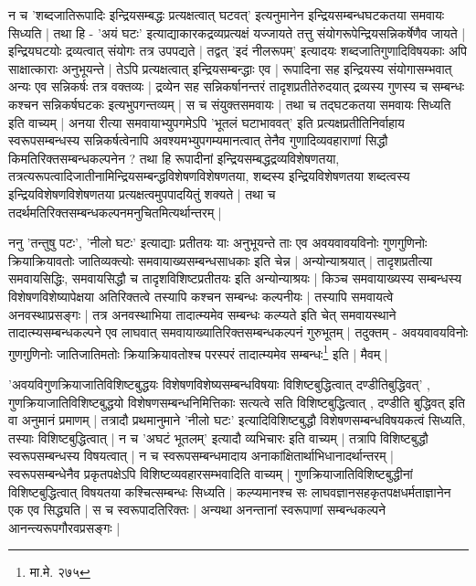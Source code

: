 न च 'शब्दजातिरूपादिः इन्द्रियसम्बद्धः प्रत्यक्षत्वात् घटवत्'  इत्यनुमानेन इन्द्रियसम्बन्धघटकतया समवायः सिध्यति | तथा हि - 'अयं घटः' इत्याद्याकारकद्रव्यप्रत्यक्षं यज्जायते तत्तु संयोगरूपेन्द्रियसन्निकर्षेणैव जायते | इन्द्रियघटयोः द्रव्यत्वात् संयोगः तत्र उपपद्यते | तद्वत् 'इदं नीलरूपम्' इत्यादयः शब्दजातिगुणादिविषयकाः अपि साक्षात्काराः अनुभूयन्ते | तेऽपि प्रत्यक्षत्वात् इन्द्रियसम्बन्द्धाः एव | रूपादिना सह इन्द्रियस्य संयोगासम्भवात् अन्यः एव सन्निकर्षः तत्र वक्तव्यः | द्रव्येन सह सन्निकर्षानन्तरं तादृशप्रतीतेरुदयात् द्रव्यस्य गुणस्य च सम्बन्धः कश्चन सन्निकर्षघटकः इत्यभुपगन्तव्यम् | स च संयुक्तसमवायः | तथा च तद्घटकतया समवायः सिध्यति इति वाच्यम् | अनया रीत्या समवायाभ्युपगमेऽपि 'भूतलं घटाभाववत्' इति प्रत्यक्षप्रतीतिनिर्वाहाय स्वरूपसम्बन्धस्य सन्निकर्षत्वेनापि अवश्यमभ्युपगम्यमानत्वात् तेनैव गुणादिव्यवहाराणां सिद्धौ किमतिरिक्तसम्बन्धकल्पनेन ? तथा हि रूपादीनां इन्द्रियसम्बद्धद्रव्यविशेषणतया, तत्रत्यरूपत्वादिजातीनामिन्द्रियसम्बन्द्धविशेषणविशेषणतया, शब्दस्य इन्द्रियविशेषणतया शब्दत्वस्य इन्द्रियविशेषणविशेषणतया प्रत्यक्षत्वमुपपादयितुं शक्यते | तथा च तदर्थमतिरिक्तसम्बन्धकल्पनमनुचितमित्यर्थान्तरम् |

ननु 'तन्तुषु पटः', 'नीलो घटः' इत्याद्याः प्रतीतयः याः अनुभूयन्ते ताः एव अवयवावयविनोः‌ गुणगुणिनोः क्रियाक्रियावतोः जातिव्यक्त्योः समवायाख्यसम्बन्धसाधकाः इति चेन्न | अन्योन्याश्रयात् | तादृशप्रतीत्या समवायसिद्धिः, समवायसिद्धौ च तादृशविशिष्टप्रतीतयः इति अन्योन्याश्रयः | किञ्च समवायाख्यस्य सम्बन्धस्य विशेषणविशेष्यापेक्षया अतिरिक्तत्वे तस्यापि कश्चन सम्बन्धः कल्पनीयः | तस्यापि समवायत्वे अनवस्थाप्रसङ्गः | तत्र अनवस्थाभिया तादात्म्यमेव सम्बन्धः कल्प्यते इति चेत् समवायस्थाने तादात्म्यसम्बन्धकल्पने एव लाघवात् समवायाख्यातिरिक्तसम्बन्धकल्पनं गुरुभूतम् | तदुक्तम् - {\fontsize{11.7}{0}\selectfont\s अवयवावयविनोः गुणगुणिनोः जातिजातिमतोः क्रियाक्रियावतोश्च परस्परं तादात्म्यमेव सम्बन्धः\footnote{मा.मे. २७५}} इति | मैवम् |

'अवयविगुणक्रियाजातिविशिष्टबुद्धयः विशेषणविशेष्यसम्बन्धविषयाः विशिष्टबुद्धित्वात् दण्डीतिबुद्धिवत्' ,  गुणक्रियाजातिविशिष्टबुद्धयो विशेषणसम्बन्धनिमित्तिकाः सत्यत्वे सति विशिष्टबुद्धित्वात् , दण्डीति बुद्धिवत् इति वा अनुमानं  प्रमाणम् | तत्रादौ प्रथमानुमाने 'नीलो घटः' इत्यादिविशिष्टबुद्धौ विशेषणसम्बन्धविषयकत्वं सिध्यति, तस्याः विशिष्टबुद्धित्वात् | न च 'अघटं भूतलम्' इत्यादौ व्यभिचारः इति वाच्यम् | तत्रापि विशिष्टबुद्धौ स्वरूपसम्बन्धस्य विषयत्वात् | न च स्वरूपसम्बन्धमादाय अनाकांक्षितार्थाभिधानादर्थान्तरम् | स्वरूपसम्बन्धेनैव प्रकृतपक्षेऽपि विशिष्टव्यवहारसम्भवादिति वाच्यम् | गुणक्रियाजातिविशिष्टबुद्धीनां विशिष्टबुद्धित्वात् विषयतया कश्चित्सम्बन्धः सिध्यति | कल्प्यमानश्च सः लाघवज्ञानसहकृतपक्षधर्मताज्ञानेन एक एव सिद्ध्यति | स च स्वरूपादतिरिक्तः | अन्यथा अनन्तानां स्वरूपाणां सम्बन्धकल्पने आनन्त्यरूपगौरवप्रसङ्गः |

